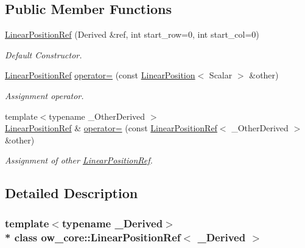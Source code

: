 \subsection*{Public Member Functions}
\begin{DoxyCompactItemize}
\item 
\hyperlink{classow__core_1_1LinearPositionRef_aac29a620399c9a5b74bef815192052f1}{Linear\+Position\+Ref} (Derived \&ref, int start\+\_\+row=0, int start\+\_\+col=0)
\begin{DoxyCompactList}\small\item\em Default Constructor. \end{DoxyCompactList}\item 
\hyperlink{classow__core_1_1LinearPositionRef}{Linear\+Position\+Ref} \hyperlink{classow__core_1_1LinearPositionRef_ad5dfddd1a6fed31e508c32f9a521db99}{operator=} (const \hyperlink{classow__core_1_1LinearPosition}{Linear\+Position}$<$ Scalar $>$ \&other)\hypertarget{classow__core_1_1LinearPositionRef_ad5dfddd1a6fed31e508c32f9a521db99}{}\label{classow__core_1_1LinearPositionRef_ad5dfddd1a6fed31e508c32f9a521db99}

\begin{DoxyCompactList}\small\item\em Assignment operator. \end{DoxyCompactList}\item 
{\footnotesize template$<$typename \+\_\+\+Other\+Derived $>$ }\\\hyperlink{classow__core_1_1LinearPositionRef}{Linear\+Position\+Ref} \& \hyperlink{classow__core_1_1LinearPositionRef_a7f52d4608c4f4c4924a8454f93184ad3}{operator=} (const \hyperlink{classow__core_1_1LinearPositionRef}{Linear\+Position\+Ref}$<$ \+\_\+\+Other\+Derived $>$ \&other)\hypertarget{classow__core_1_1LinearPositionRef_a7f52d4608c4f4c4924a8454f93184ad3}{}\label{classow__core_1_1LinearPositionRef_a7f52d4608c4f4c4924a8454f93184ad3}

\begin{DoxyCompactList}\small\item\em Assignment of other \hyperlink{classow__core_1_1LinearPositionRef}{Linear\+Position\+Ref}. \end{DoxyCompactList}\end{DoxyCompactItemize}


\subsection{Detailed Description}
\subsubsection*{template$<$typename \+\_\+\+Derived$>$\\*
class ow\+\_\+core\+::\+Linear\+Position\+Ref$<$ \+\_\+\+Derived $>$}

